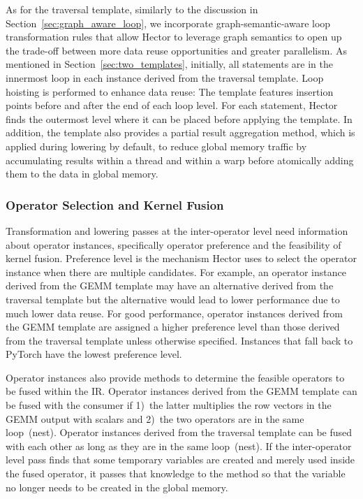 As for the traversal template, similarly to the discussion in Section~\ref{sec:graph_aware_loop}, we incorporate graph-semantic-aware loop transformation rules that allow Hector to leverage graph semantics to open up the trade-off between more data reuse opportunities and greater parallelism. As mentioned in Section~\ref{sec:two_templates}, initially, all statements are in the innermost loop in each instance derived from the traversal template. 
Loop hoisting is performed to enhance data reuse: The template features insertion points before and after the end of each loop level. For each statement, Hector finds the outermost level where it can be placed before applying the template. 
In addition, the template also provides a partial result aggregation method, which is applied during lowering by default, to reduce global memory traffic by accumulating results within a thread and within a warp before atomically adding them to the data in global memory.


\subsubsection{Operator Selection and Kernel Fusion}
Transformation and lowering passes at the inter-operator level need information about operator instances, specifically operator preference %
and the feasibility of kernel fusion.
Preference level is the mechanism Hector uses to select the operator instance when there are multiple candidates. For example, an operator instance derived from the GEMM template may %
 have an alternative derived from the traversal template but the alternative would lead to lower performance due to much lower data reuse. 
For good performance, operator instances derived from the GEMM template are assigned a higher preference level than those derived from the traversal template unless otherwise specified. Instances that fall back to PyTorch have the lowest preference level.

Operator instances also provide methods to determine the feasible operators to be fused within the IR. %
Operator instances derived from the GEMM template can be fused with the consumer if 1)~the latter multiplies the row vectors in the GEMM output with scalars and 2)~the two operators are in the same loop~(nest). Operator instances derived from the traversal template can be fused with each other as long as they are in the same loop~(nest).
If the inter-operator level pass finds that some temporary variables are created and merely used inside the fused operator, it passes that knowledge to the method so that the variable no longer needs to be created in the global memory.



